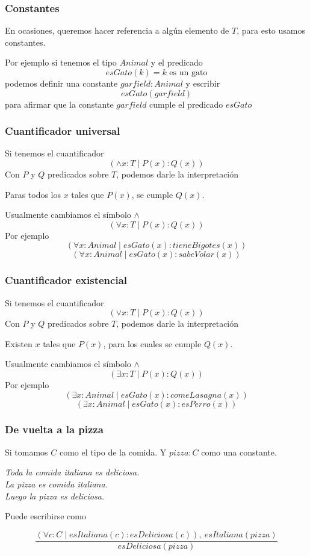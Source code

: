 \documentclass{beamer}
\begin{document}
\begin{frame}[fragile]
    \frametitle{Constantes}
        En ocasiones, queremos hacer referencia a algún elemento de $T$, para esto usamos constantes.

        Por ejemplo si tenemos el tipo $Animal$ y el predicado
        $$esGato(k) = k\text{ es un gato}$$
        podemos definir una constante $garfield: Animal$ y escribir
        $$esGato(garfield)$$
        para afirmar que la constante $garfield$ cumple el predicado $esGato$
\end{frame}

\begin{frame}[fragile]
    \frametitle{Cuantificador universal}
        Si tenemos el cuantificador 
        $$(\land x:T \mid P(x) : Q(x))$$
        Con $P$ y $Q$ predicados sobre $T$, podemos darle la interpretación
        \begin{center}
            Paras todos los $x$ tales que $P(x)$, se cumple $Q(x)$.
        \end{center}
        Usualmente cambiamos el símbolo $\land$
        $$(\forall x:T \mid P(x) : Q(x))$$
        Por ejemplo
        $$(\forall x:Animal \mid esGato(x) : tieneBigotes(x))$$
        $$(\forall x:Animal \mid esGato(x) : sabeVolar(x))$$
\end{frame}

\begin{frame}[fragile]
    \frametitle{Cuantificador existencial}
        Si tenemos el cuantificador 
        $$(\lor x:T \mid P(x) : Q(x))$$
        Con $P$ y $Q$ predicados sobre $T$, podemos darle la interpretación
        \begin{center}
            Existen $x$ tales que $P(x)$, para los cuales se cumple $Q(x)$.
        \end{center}
        Usualmente cambiamos el símbolo $\land$
        $$(\exists x:T \mid P(x) : Q(x))$$
        Por ejemplo
        $$(\exists x:Animal \mid esGato(x) : comeLasagna(x))$$
        $$(\exists x:Animal \mid esGato(x) : esPerro(x))$$
\end{frame}

\begin{frame}[fragile]
    \frametitle{De vuelta a la pizza}

    Si tomamos $C$ como el tipo de la comida. Y $pizza:C$ como una constante.

    \begin{center}
        \textit{Toda la comida italiana es deliciosa.\\ 
        La pizza es comida italiana.\\
        Luego la pizza es deliciosa.}
    \end{center}
    
    Puede escribirse como

    $$\frac{(\forall c: C \mid esItaliana(c): esDeliciosa(c)),\ esItaliana(pizza)}{esDeliciosa(pizza)}$$
\end{frame}
\end{document}
